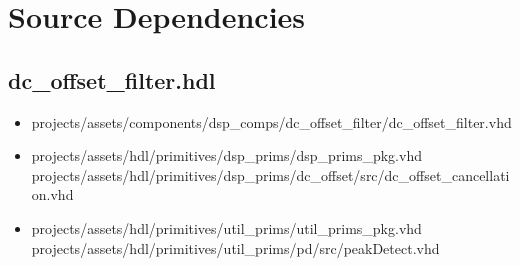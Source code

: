 \documentclass{article}
\def\comp{dc\_offset\_filter}
\begin{document}
	\section*{Source Dependencies}
	\subsection*{\comp.hdl}
	\begin{itemize}
		\item projects/assets/components/dsp\_comps/dc\_offset\_filter/dc\_offset\_filter.vhd
		\item projects/assets/hdl/primitives/dsp\_prims/dsp\_prims\_pkg.vhd
		      \subitem projects/assets/hdl/primitives/dsp\_prims/dc\_offset/src/dc\_offset\_cancellation.vhd
		\item projects/assets/hdl/primitives/util\_prims/util\_prims\_pkg.vhd
		      \subitem projects/assets/hdl/primitives/util\_prims/pd/src/peakDetect.vhd
	\end{itemize}
\end{document}
